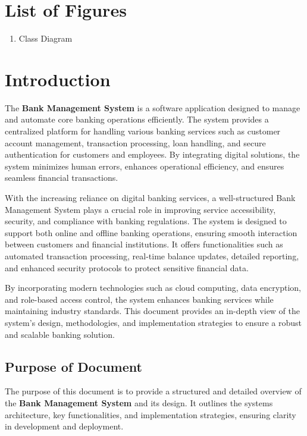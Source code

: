 \section{List of Figures}\label{list-of-figures}

\begin{enumerate}
\def\labelenumi{\arabic{enumi}.}
\item
  Class Diagram
\end{enumerate}

\section{Introduction}\label{introduction}

The \textbf{Bank Management System} is a software application designed
to manage and automate core banking operations efficiently. The system
provides a centralized platform for handling various banking services
such as customer account management, transaction processing, loan
handling, and secure authentication for customers and employees. By
integrating digital solutions, the system minimizes human errors,
enhances operational efficiency, and ensures seamless financial
transactions.

With the increasing reliance on digital banking services, a
well-structured Bank Management System plays a crucial role in improving
service accessibility, security, and compliance with banking
regulations. The system is designed to support both online and offline
banking operations, ensuring smooth interaction between customers and
financial institutions. It offers functionalities such as automated
transaction processing, real-time balance updates, detailed reporting,
and enhanced security protocols to protect sensitive financial data.

By incorporating modern technologies such as cloud computing, data
encryption, and role-based access control, the system enhances banking
services while maintaining industry standards. This document provides an
in-depth view of the system's design, methodologies, and implementation
strategies to ensure a robust and scalable banking solution.

\subsection{Purpose of Document}\label{purpose-of-document}

\protect{}\label{X918f79d1401d26e11fe5c5060cfda901dfd4841}{}The
purpose of this document is to provide a structured and detailed
overview of the \textbf{Bank Management System} and its design. It
outlines the systems architecture, key functionalities, and
implementation strategies, ensuring clarity in development and
deployment.

